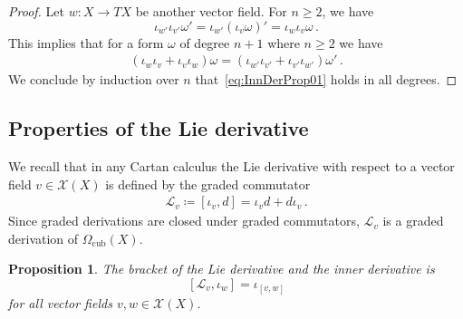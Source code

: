 \documentclass[12pt,reqno, a4paper]{amsart}
\numberwithin{equation}{section}
\theoremstyle{plain}
\newtheorem{Proposition}[Theorem]{Proposition}
\theoremstyle{definition}
\theoremstyle{remark}
\newcommand{\calX}{\mathcal{X}}
\newcommand{\Lie}{\mathcal{L}}
\begin{document}
\begin{proof}
Let $w\colon X \to TX$ be another vector field. For $n \geq 2$, we have
\begin{equation*}
  \iota_{w'}\iota_{v'}\omega'
  = \iota_{w'}(\iota_v\omega)'
  = \iota_w \iota_v\omega
  \,.
\end{equation*}
This implies that for a form $\omega$ of degree $n+1$ where $n \geq 2$ we have
\begin{equation*}
\begin{split}
  (\iota_w \iota_v + \iota_v \iota_w)  \omega
  =
  (\iota_{w'} \iota_{v'} + \iota_{v'} \iota_{w'}) \omega'
  \,.
\end{split}
\end{equation*}
We conclude by induction over $n$ that~\eqref{eq:InnDerProp01} holds in all degrees.
\end{proof}



\subsection{Properties of the Lie derivative}

We recall that in any Cartan calculus the Lie derivative with respect to a vector field $v \in \calX(X)$ is defined by the graded commutator
\begin{equation*}
\begin{split}
  \Lie_v \coloneqq [\iota_v, d] = \iota_v d + d \iota_v
  \,.
\end{split}
\end{equation*}
Since graded derivations are closed under graded commutators, $\Lie_v$ is a graded derivation of $\Omega_\mathrm{cub}(X)$.

\begin{Proposition}
\label{prop:LieInnDerBracket}
The bracket of the Lie derivative and the inner derivative is
\begin{equation}
\label{eq:LieInnDerBracket}
  [\Lie_v, \iota_w] = \iota_{[v,w]}
\end{equation}
for all vector fields $v, w \in \calX(X)$.
\end{Proposition}
\end{document}
